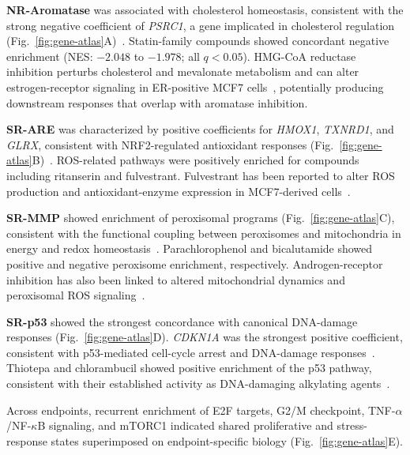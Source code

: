\documentclass[11pt,a4paper]{article}
\begin{document}
\textbf{NR-Aromatase} was associated with cholesterol homeostasis, consistent with the strong negative coefficient of \textit{PSRC1}, a gene implicated in cholesterol regulation (Fig.~\ref{fig:gene-atlas}A)~\cite{luo2022psrc1}. Statin-family compounds showed concordant negative enrichment (NES: \(-2.048\) to \(-1.978\); all \(q<0.05\)). HMG-CoA reductase inhibition perturbs cholesterol and mevalonate metabolism and can alter estrogen-receptor signaling in ER-positive MCF7 cells~\cite{hewitt2003aromatase,simigdala2016cholesterol}, potentially producing downstream responses that overlap with aromatase inhibition.

\textbf{SR-ARE} was characterized by positive coefficients for \textit{HMOX1}, \textit{TXNRD1}, and \textit{GLRX}, consistent with NRF2-regulated antioxidant responses (Fig.~\ref{fig:gene-atlas}B)~\cite{reichard2007nrf2}. ROS-related pathways were positively enriched for compounds including ritanserin and fulvestrant. Fulvestrant has been reported to alter ROS production and antioxidant-enzyme expression in MCF7-derived cells~\cite{badia2016fulvestrant}.

\textbf{SR-MMP} showed enrichment of peroxisomal programs (Fig.~\ref{fig:gene-atlas}C), consistent with the functional coupling between peroxisomes and mitochondria in energy and redox homeostasis~\cite{fransen2017peroxisome}. Parachlorophenol and bicalutamide showed positive and negative peroxisome enrichment, respectively. Androgen-receptor inhibition has also been linked to altered mitochondrial dynamics and peroxisomal ROS signaling~\cite{shiota2024peroxisome}.

\textbf{SR-p53} showed the strongest concordance with canonical DNA-damage responses (Fig.~\ref{fig:gene-atlas}D). \textit{CDKN1A} was the strongest positive coefficient, consistent with p53-mediated cell-cycle arrest and DNA-damage responses~\cite{allen2014p53}. Thiotepa and chlorambucil showed positive enrichment of the p53 pathway, consistent with their established activity as DNA-damaging alkylating agents~\cite{weber2015dnadamaging,krassnig2023chlorambucil}.

Across endpoints, recurrent enrichment of E2F targets, G2/M checkpoint, TNF-\(\alpha\)/NF-\(\kappa\)B signaling, and mTORC1 indicated shared proliferative and stress-response states superimposed on endpoint-specific biology (Fig.~\ref{fig:gene-atlas}E).
\end{document}

